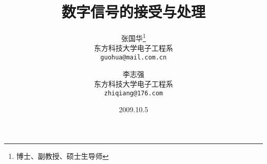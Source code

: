 \documentclass{ctexart}
\begin{document}
\title{%
\vspace{-30mm}\heiti\Huge 数字信号的接受与处理\vspace{9mm}
}
\author{%
张国华\thanks{博士、副教授、硕士生导师}
\\[2mm]
东方科技大学电子工程系\\
\texttt{guohua@mail.com.cn}
\and 李志强
\\[2mm]
东方科技大学电子工程系\\
\texttt{zhiqiang@176.com}
}
\date{2009.10.5}
\maketitle
\end{document}
